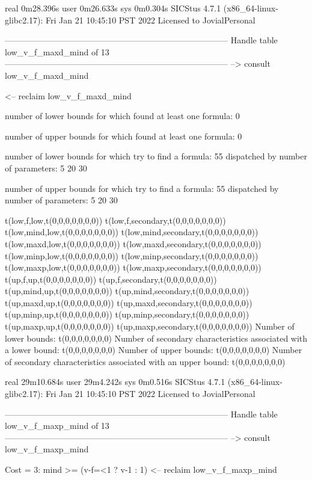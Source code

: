 real	0m28.396s
user	0m26.633s
sys	0m0.304s
SICStus 4.7.1 (x86_64-linux-glibc2.17): Fri Jan 21 10:45:10 PST 2022
Licensed to JovialPersonal


--------------------------------------------------------------------------------
Handle table low_v_f_maxd_mind of 13
--------------------------------------------------------------------------------
--> consult low_v_f_maxd_mind

<-- reclaim low_v_f_maxd_mind

number of lower bounds for which found at least one formula: 0

number of upper bounds for which found at least one formula: 0

number of lower bounds for which try to find a formula: 55
dispatched by number of parameters: 5  20  30

number of upper bounds for which try to find a formula: 55
dispatched by number of parameters: 5  20  30

t(low,f,low,t(0,0,0,0,0,0,0))
t(low,f,secondary,t(0,0,0,0,0,0,0))
t(low,mind,low,t(0,0,0,0,0,0,0))
t(low,mind,secondary,t(0,0,0,0,0,0,0))
t(low,maxd,low,t(0,0,0,0,0,0,0))
t(low,maxd,secondary,t(0,0,0,0,0,0,0))
t(low,minp,low,t(0,0,0,0,0,0,0))
t(low,minp,secondary,t(0,0,0,0,0,0,0))
t(low,maxp,low,t(0,0,0,0,0,0,0))
t(low,maxp,secondary,t(0,0,0,0,0,0,0))
t(up,f,up,t(0,0,0,0,0,0,0))
t(up,f,secondary,t(0,0,0,0,0,0,0))
t(up,mind,up,t(0,0,0,0,0,0,0))
t(up,mind,secondary,t(0,0,0,0,0,0,0))
t(up,maxd,up,t(0,0,0,0,0,0,0))
t(up,maxd,secondary,t(0,0,0,0,0,0,0))
t(up,minp,up,t(0,0,0,0,0,0,0))
t(up,minp,secondary,t(0,0,0,0,0,0,0))
t(up,maxp,up,t(0,0,0,0,0,0,0))
t(up,maxp,secondary,t(0,0,0,0,0,0,0))
Number of lower bounds:                                             t(0,0,0,0,0,0,0)
Number of secondary characteristics associated with a lower bound:  t(0,0,0,0,0,0,0)
Number of upper bounds:                                             t(0,0,0,0,0,0,0)
Number of secondary characteristics associated with an upper bound: t(0,0,0,0,0,0,0)

real	29m10.684s
user	29m4.242s
sys	0m0.516s
SICStus 4.7.1 (x86_64-linux-glibc2.17): Fri Jan 21 10:45:10 PST 2022
Licensed to JovialPersonal


--------------------------------------------------------------------------------
Handle table low_v_f_maxp_mind of 13
--------------------------------------------------------------------------------
--> consult low_v_f_maxp_mind

Cost =  3:  mind >= (v-f=<1 ? v-1 : 1)
<-- reclaim low_v_f_maxp_mind


